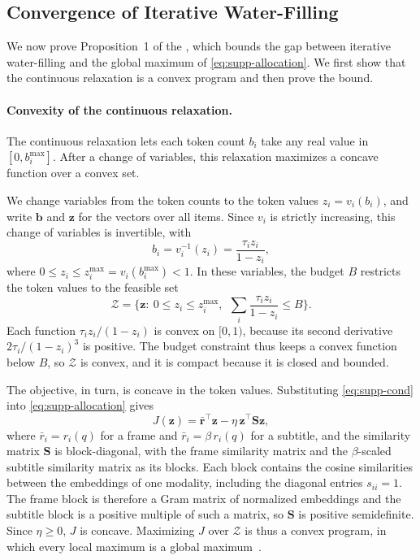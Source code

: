 \subsection{Convergence of Iterative Water-Filling}
\label{sec:supp-convergence}
\label{sec:supp-convex}

We now prove Proposition~1 of the \mainpaper, which bounds the gap between iterative water-filling and the global maximum of \cref{eq:supp-allocation}. We first show that the continuous relaxation is a convex program and then prove the bound.

\paragraph{Convexity of the continuous relaxation.}
The continuous relaxation lets each token count $b_i$ take any real value in $[0,b_i^{\max}]$. After a change of variables, this relaxation maximizes a concave function over a convex set.

We change variables from the token counts to the token values $z_i=v_i(b_i)$, and write $\mathbf b$ and $\mathbf z$ for the vectors over all items. Since $v_i$ is strictly increasing, this change of variables is invertible, with
\begin{equation}
  b_i=v_i^{-1}(z_i)=\frac{\tau_i z_i}{1-z_i} ,
\label{eq:supp-inverse}
\end{equation}
where $0\le z_i\le z_i^{\max}=v_i(b_i^{\max})<1$.
In these variables, the budget $B$ restricts the token values to the feasible set
\begin{equation}
  \mathcal Z=\Big\{\mathbf z:\ 0\le z_i\le z_i^{\max},\ \ \sum_{i}\frac{\tau_i z_i}{1-z_i}\le B\Big\} .
\label{eq:supp-feasible}
\end{equation}
Each function $\tau_i z_i/(1-z_i)$ is convex on $[0,1)$, because its second derivative $2\tau_i/(1-z_i)^3$ is positive. The budget constraint thus keeps a convex function below $B$, so $\mathcal Z$ is convex, and it is compact because it is closed and bounded.

The objective, in turn, is concave in the token values. Substituting \cref{eq:supp-cond} into \cref{eq:supp-allocation} gives
\begin{equation}
  J(\mathbf z)=\bar{\mathbf r}^{\top}\mathbf z-\eta\,\mathbf z^{\top}\mathbf S\mathbf z ,
\label{eq:supp-quadratic}
\end{equation}
where $\bar r_i=r_i(q)$ for a frame and $\bar r_i=\beta\,r_i(q)$ for a subtitle, and the similarity matrix $\mathbf S$ is block-diagonal, with the frame similarity matrix and the $\beta$-scaled subtitle similarity matrix as its blocks. Each block contains the cosine similarities between the embeddings of one modality, including the diagonal entries $s_{ii}=1$. The frame block is therefore a Gram matrix of normalized embeddings and the subtitle block is a positive multiple of such a matrix, so $\mathbf S$ is positive semidefinite. Since $\eta\ge0$, $J$ is concave. Maximizing $J$ over $\mathcal Z$ is thus a convex program, in which every local maximum is a global maximum~\cite{boyd2004}.

